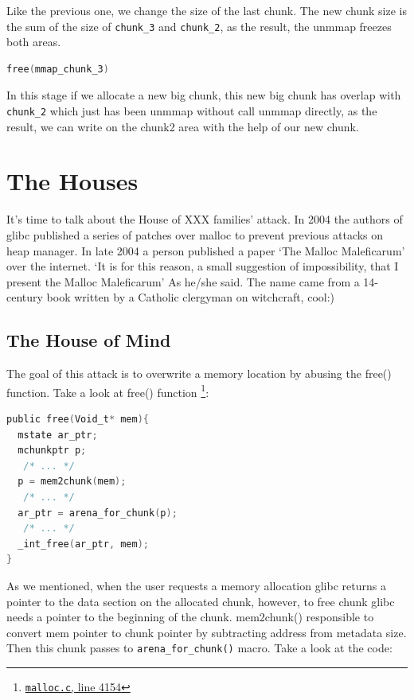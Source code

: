 \documentclass{masterthesis}
\newcommand*\libc{glibc}
\begin{document}
Like the previous one, we change the size of the last chunk. The new chunk size is the sum of the size of \lstinline{chunk_3} and \lstinline{chunk_2}, as the result, the unmmap freezes both areas.

\begin{lstlisting}[language=c,frame=tlrb]
free(mmap_chunk_3)
 \end{lstlisting}
 
In this stage if we allocate a new big chunk, this new big chunk has overlap with \lstinline{chunk_2} which just has been unmmap without call unmmap directly, as the result, we can write on the chunk2 area with the help of our new chunk.

\section{The Houses}

It's time to talk about the House of XXX families' attack. In 2004 the authors of \libc{} published a series of patches over malloc to prevent previous attacks on heap manager. In late 2004 a person published a paper ‘The Malloc Maleficarum’ over the internet. ‘It is for this reason, a small suggestion of impossibility, that I present the Malloc Maleficarum’ As he/she said. The name came from a 14-century book written by a Catholic clergyman on witchcraft, cool:)

\subsection{The House of Mind}
The goal of this attack is to overwrite a memory location by abusing the free() function. Take a look at free() function \footnote{\href{https://sourceware.org/git/?p=glibc.git;a=blob;f=malloc/malloc.c;h=f7cd29bc2f93e1082ee77800bd64a4b2a2897055;hb=9ea3686266dca3f004ba874745a4087a89682617\#l4154}{\texttt{malloc.c}, line 4154}}: 
\begin{lstlisting}[language=c,frame=tlrb]
public free(Void_t* mem){
  mstate ar_ptr;
  mchunkptr p;    
   /* ... */ 
  p = mem2chunk(mem);
   /* ... */ 
  ar_ptr = arena_for_chunk(p);
   /* ... */ 
  _int_free(ar_ptr, mem);
}
 \end{lstlisting}
As we mentioned, when the user requests a memory allocation \libc{} returns a pointer to the data section on the allocated chunk, however, to free chunk \libc{} needs a pointer to the beginning of the chunk. mem2chunk() responsible to convert mem pointer to chunk pointer by subtracting address from metadata size. Then this chunk passes to \lstinline{arena_for_chunk()} macro. Take a look at the code: 
\end{document}
